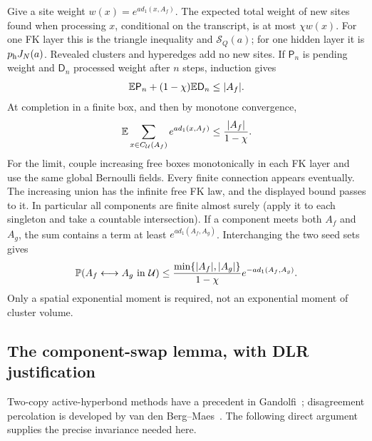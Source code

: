 Give a site weight $w(x)=e^{a d_1(x,A_f)}$. The expected total weight of new sites found when processing $x$, conditional on the transcript, is at most $\chi w(x)$. For one FK layer this is the triangle inequality and $\mathcal S_Q(a)$; for one hidden layer it is $p_{\rm h}J_N(a)$. Revealed clusters and hyperedges add no new sites. If $\mathsf P_n$ is pending weight and $\mathsf D_n$ processed weight after $n$ steps, induction gives
\[
 \mathbb E \mathsf P_n+(1-\chi)\mathbb E \mathsf D_n\le |A_f|.
\]
At completion in a finite box, and then by monotone convergence,
\begin{equation}\label{eq:union-moment}
 \mathbb E\sum_{x\in C_{\mathcal U}(A_f)}e^{a d_1(x,A_f)}
 \le\frac{|A_f|}{1-\chi}.
\end{equation}
For the limit, couple increasing free boxes monotonically in each FK layer and use the same global Bernoulli fields. Every finite connection appears eventually. The increasing union has the infinite free FK law, and the displayed bound passes to it. In particular all components are finite almost surely (apply it to each singleton and take a countable intersection). If a component meets both $A_f$ and $A_g$, the sum contains a term at least $e^{a d_1(A_f,A_g)}$. Interchanging the two seed sets gives
\begin{equation}\label{eq:union-connect}
 \mathbb P(A_f\longleftrightarrow A_g\text{ in }\mathcal U)
 \le\frac{\min\{|A_f|,|A_g|\}}{1-\chi}
        e^{-a d_1(A_f,A_g)}.
\end{equation}
Only a spatial exponential moment is required, not an exponential moment of cluster volume.

\subsection{The component-swap lemma, with DLR justification}\label{sec:full-swap}
Two-copy active-hyperbond methods have a precedent in Gandolfi~\cite{Gandolfi}; disagreement percolation is developed by van den Berg--Maes~\cite{vdBM}. The following direct argument supplies the precise invariance needed here.

